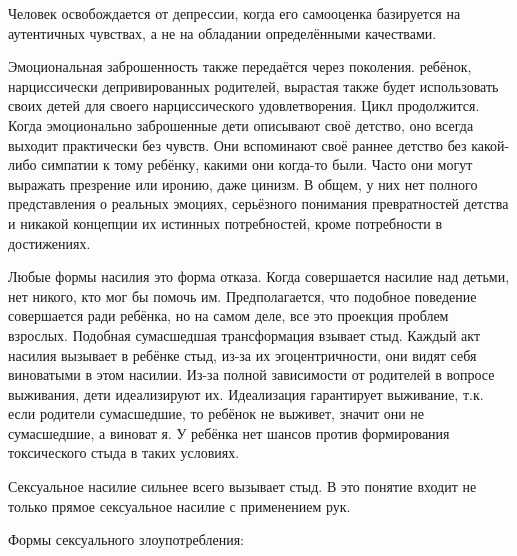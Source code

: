 \documentclass[10pt, fleqn]{article}
\begin{document}
Человек освобождается от депрессии, когда его самооценка базируется на аутентичных чувствах, а не на обладании определёнными качествами.

Эмоциональная заброшенность также передаётся через поколения. ребёнок, нарциссически депривированных родителей, вырастая также будет использовать своих детей для своего нарциссического удовлетворения. Цикл продолжится.
Когда эмоционально заброшенные дети описывают своё детство, оно всегда выходит практически без чувств. Они вспоминают своё раннее детство без какой-либо симпатии к тому ребёнку, какими они когда-то были. Часто они могут выражать презрение или иронию, даже цинизм. В общем, у них нет полного представления о реальных эмоциях, серьёзного понимания превратностей детства и никакой концепции их истинных потребностей, кроме потребности в достижениях.


Любые формы насилия это форма отказа. Когда совершается насилие над детьми, нет никого, кто мог бы помочь им. Предполагается, что подобное поведение совершается ради ребёнка, но на самом деле, все это проекция проблем взрослых. Подобная сумасшедшая трансформация взывает стыд. Каждый акт насилия вызывает в ребёнке стыд, из-за их эгоцентричности, они видят себя виноватыми в этом насилии.
Из-за полной зависимости от родителей в вопросе выживания, дети идеализируют их. Идеализация гарантирует выживание, т.к. если родители сумасшедшие, то ребёнок не выживет, значит они не сумасшедшие, а виноват я.
У ребёнка нет шансов против формирования токсического стыда в таких условиях.


Сексуальное насилие сильнее всего вызывает стыд. В это понятие входит не только прямое сексуальное насилие с применением рук.

Формы сексуального злоупотребления:
\end{document}

